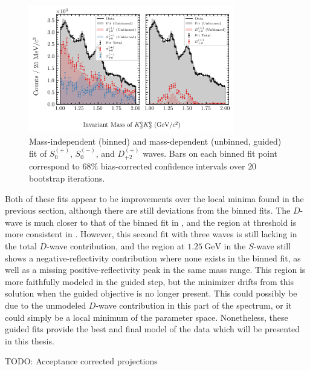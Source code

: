 \begin{figure}
  \begin{center}
    \includegraphics[width=0.8\textwidth]{figures/binned_and_unbinned_fit_chisqdof_3.4_splot_D_1s_2b_guided_phase_factor_waves29099_uncertainty_bootstrap-SE.png}
  \end{center}
  \caption{Mass-independent (binned) and mass-dependent (unbinned, guided) fit of $S_{0}^{(+)}$, $S_{0}^{(-)}$, and $D_{+2}^{(+)}$ waves. Bars on each binned fit point correspond to $68\%$ bias-corrected confidence intervals over $20$ bootstrap iterations.}\label{fig:unbinned-guided-fit-chisqdof-3.4-Spn-D2p}
\end{figure}

Both of these fits appear to be improvements over the local minima found in the previous section, although there are still deviations from the binned fits. The $D$-wave is much closer to that of the binned fit in , and the region at threshold is more consistent in . However, this second fit with three waves is still lacking in the total $D$-wave contribution, and the region at $\SI{1.25}{\giga\electronvolt}$ in the $S$-wave still shows a negative-reflectivity contribution where none exists in the binned fit, as well as a missing positive-reflectivity peak in the same mass range. This region is more faithfully modeled in the guided step, but the minimizer drifts from this solution when the guided objective is no longer present. This could possibly be due to the unmodeled $D$-wave contribution in this part of the spectrum, or it could simply be a local minimum of the parameter space. Nonetheless, these guided fits provide the best and final model of the data which will be presented in this thesis.

{\color{red}TODO: Acceptance corrected projections}

